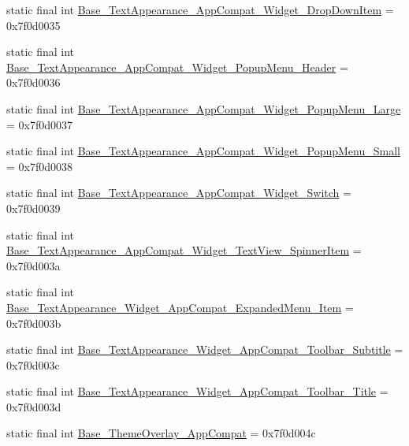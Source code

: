 \begin{DoxyCompactItemize}
\item 
static final int \mbox{\hyperlink{classandroid_1_1support_1_1design_1_1_r_1_1style_a4f75f7f5cd1a8bfff243fcd33f3dc6fc}{Base\+\_\+\+Text\+Appearance\+\_\+\+App\+Compat\+\_\+\+Widget\+\_\+\+Drop\+Down\+Item}} = 0x7f0d0035
\item 
static final int \mbox{\hyperlink{classandroid_1_1support_1_1design_1_1_r_1_1style_a071fcb2facba65ba209af2cce0afdb51}{Base\+\_\+\+Text\+Appearance\+\_\+\+App\+Compat\+\_\+\+Widget\+\_\+\+Popup\+Menu\+\_\+\+Header}} = 0x7f0d0036
\item 
static final int \mbox{\hyperlink{classandroid_1_1support_1_1design_1_1_r_1_1style_ac73eb9fb932bb8b622db57a9f16b18e2}{Base\+\_\+\+Text\+Appearance\+\_\+\+App\+Compat\+\_\+\+Widget\+\_\+\+Popup\+Menu\+\_\+\+Large}} = 0x7f0d0037
\item 
static final int \mbox{\hyperlink{classandroid_1_1support_1_1design_1_1_r_1_1style_a5a039a7fe6bfb5737ea3ab4db879e191}{Base\+\_\+\+Text\+Appearance\+\_\+\+App\+Compat\+\_\+\+Widget\+\_\+\+Popup\+Menu\+\_\+\+Small}} = 0x7f0d0038
\item 
static final int \mbox{\hyperlink{classandroid_1_1support_1_1design_1_1_r_1_1style_a0fbdc925b35d8ab7f73a1b63ffe619c2}{Base\+\_\+\+Text\+Appearance\+\_\+\+App\+Compat\+\_\+\+Widget\+\_\+\+Switch}} = 0x7f0d0039
\item 
static final int \mbox{\hyperlink{classandroid_1_1support_1_1design_1_1_r_1_1style_a0716f65966220a21fc073fb525e91797}{Base\+\_\+\+Text\+Appearance\+\_\+\+App\+Compat\+\_\+\+Widget\+\_\+\+Text\+View\+\_\+\+Spinner\+Item}} = 0x7f0d003a
\item 
static final int \mbox{\hyperlink{classandroid_1_1support_1_1design_1_1_r_1_1style_a4268c80f559de038c8cece74dae902c0}{Base\+\_\+\+Text\+Appearance\+\_\+\+Widget\+\_\+\+App\+Compat\+\_\+\+Expanded\+Menu\+\_\+\+Item}} = 0x7f0d003b
\item 
static final int \mbox{\hyperlink{classandroid_1_1support_1_1design_1_1_r_1_1style_a31d10ebb57d33a7aa2b3125aa2370409}{Base\+\_\+\+Text\+Appearance\+\_\+\+Widget\+\_\+\+App\+Compat\+\_\+\+Toolbar\+\_\+\+Subtitle}} = 0x7f0d003c
\item 
static final int \mbox{\hyperlink{classandroid_1_1support_1_1design_1_1_r_1_1style_a2c616fade1ea43a6d49ebe1f3353f781}{Base\+\_\+\+Text\+Appearance\+\_\+\+Widget\+\_\+\+App\+Compat\+\_\+\+Toolbar\+\_\+\+Title}} = 0x7f0d003d
\item 
static final int \mbox{\hyperlink{classandroid_1_1support_1_1design_1_1_r_1_1style_a19e25d7536a593b72a1d1faffc55770e}{Base\+\_\+\+Theme\+Overlay\+\_\+\+App\+Compat}} = 0x7f0d004c

\end{DoxyCompactItemize}
